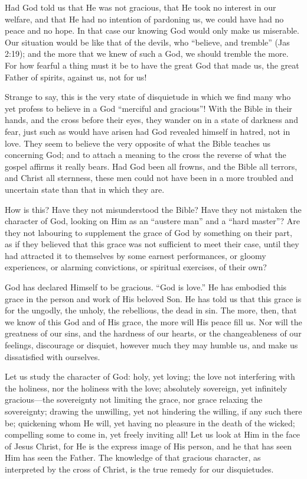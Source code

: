 \documentclass[
]{book}
\begin{document}
Had God told us that He was not gracious, that He took no interest in our welfare, and that He had no intention of pardoning us, we could have had no peace and no hope. In that case our knowing God would only make us miserable. Our situation would be like that of the devils, who ``believe, and tremble'' (Jas 2:19); and the more that we knew of such a God, we should tremble the more. For how fearful a thing must it be to have the great God that made us, the great Father of spirits, against us, not for us!

Strange to say, this is the very state of disquietude in which we find many who yet profess to believe in a God ``merciful and gracious''! With the Bible in their hands, and the cross before their eyes, they wander on in a state of darkness and fear, just such as would have arisen had God revealed himself in hatred, not in love. They seem to believe the very opposite of what the Bible teaches us concerning God; and to attach a meaning to the cross the reverse of what the gospel affirms it really bears. Had God been all frowns, and the Bible all terrors, and Christ all sternness, these men could not have been in a more troubled and uncertain state than that in which they are.

How is this? Have they not misunderstood the Bible? Have they not mistaken the character of God, looking on Him as an ``austere man'' and a ``hard master''? Are they not labouring to supplement the grace of God by something on their part, as if they believed that this grace was not sufficient to meet their case, until they had attracted it to themselves by some earnest performances, or gloomy experiences, or alarming convictions, or spiritual exercises, of their own?

God has declared Himself to be gracious. ``God is love.'' He has embodied this grace in the person and work of His beloved Son. He has told us that this grace is for the ungodly, the unholy, the rebellious, the dead in sin. The more, then, that we know of this God and of His grace, the more will His peace fill us. Nor will the greatness of our sins, and the hardness of our hearts, or the changeableness of our feelings, discourage or disquiet, however much they may humble us, and make us dissatisfied with ourselves.

Let us study the character of God: holy, yet loving; the love not interfering with the holiness, nor the holiness with the love; absolutely sovereign, yet infinitely gracious---the sovereignty not limiting the grace, nor grace relaxing the sovereignty; drawing the unwilling, yet not hindering the willing, if any such there be; quickening whom He will, yet having no pleasure in the death of the wicked; compelling some to come in, yet freely inviting all! Let us look at Him in the face of Jesus Christ, for He is the express image of His person, and he that has seen Him has seen the Father. The knowledge of that gracious character, as interpreted by the cross of Christ, is the true remedy for our disquietudes.
\end{document}
